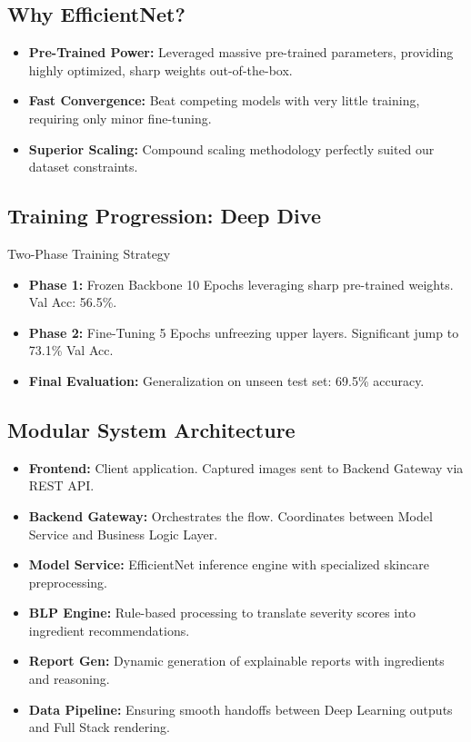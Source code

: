 \documentclass[12pt,a4paper]{article}
\begin{document}
\subsection{Why EfficientNet?}
\begin{itemize}
    \item \textbf{Pre-Trained Power:} Leveraged massive pre-trained parameters, providing highly optimized, sharp weights out-of-the-box.
    \item \textbf{Fast Convergence:} Beat competing models with very little training, requiring only minor fine-tuning.
    \item \textbf{Superior Scaling:} Compound scaling methodology perfectly suited our dataset constraints.
\end{itemize}

\subsection{Training Progression: Deep Dive}
Two-Phase Training Strategy
\begin{itemize}
    \item \textbf{Phase 1:} Frozen Backbone 10 Epochs leveraging sharp pre-trained weights. Val Acc: 56.5\%.
    \item \textbf{Phase 2:} Fine-Tuning 5 Epochs unfreezing upper layers. Significant jump to 73.1\% Val Acc.
    \item \textbf{Final Evaluation:} Generalization on unseen test set: 69.5\% accuracy.
\end{itemize}

\subsection{Modular System Architecture}
\begin{itemize}
    \item \textbf{Frontend:} Client application. Captured images sent to Backend Gateway via REST API.
    \item \textbf{Backend Gateway:} Orchestrates the flow. Coordinates between Model Service and Business Logic Layer.
    \item \textbf{Model Service:} EfficientNet inference engine with specialized skincare preprocessing.
    \item \textbf{BLP Engine:} Rule-based processing to translate severity scores into ingredient recommendations.
    \item \textbf{Report Gen:} Dynamic generation of explainable reports with ingredients and reasoning.
    \item \textbf{Data Pipeline:} Ensuring smooth handoffs between Deep Learning outputs and Full Stack rendering.
\end{itemize}
\end{document}
